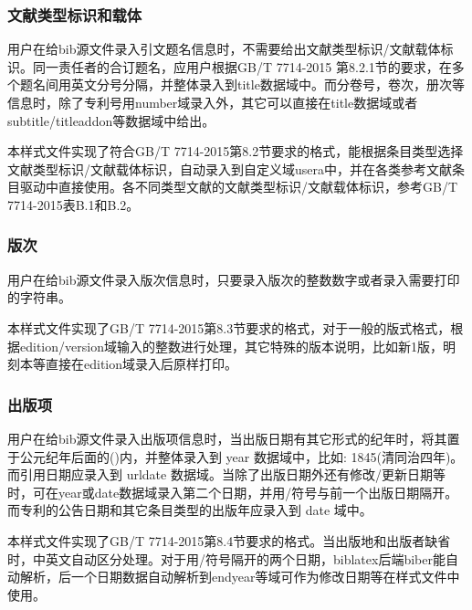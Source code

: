 \subsubsection{文献类型标识和载体}

\begin{property}{}{}
用户在给bib源文件录入引文题名信息时，不需要给出文献类型标识/文献载体标识。同一责任者的合订题名，应用户根据GB/T 7714-2015 第8.2.1节的要求，在多个题名间用英文分号分隔，并整体录入到title数据域中。而分卷号，卷次，册次等信息时，除了专利号用number域录入外，其它可以直接在title数据域或者subtitle/titleaddon等数据域中给出。

本样式文件实现了符合GB/T 7714-2015第8.2节要求的格式，能根据条目类型选择文献类型标识/文献载体标识，自动录入到自定义域usera中，并在各类参考文献条目驱动中直接使用。各不同类型文献的文献类型标识/文献载体标识，参考GB/T 7714-2015表B.1和B.2。
\end{property}

\subsubsection{版次}\label{sec:fmt:edition}

\begin{property}{}{}
用户在给bib源文件录入版次信息时，只要录入版次的整数数字或者录入需要打印的字符串。

本样式文件实现了GB/T 7714-2015第8.3节要求的格式，对于一般的版式格式，根据edition/version域输入的整数进行处理，其它特殊的版本说明，比如新1版，明刻本等直接在edition域录入后原样打印。
\end{property}

\subsubsection{出版项}\label{sec:fmt:pubitem}

\begin{property}{}{}
用户在给bib源文件录入出版项信息时，当出版日期有其它形式的纪年时，将其置于公元纪年后面的()内，并整体录入到 year 数据域中，比如: 1845(清同治四年)。而引用日期应录入到 urldate 数据域。当除了出版日期外还有修改/更新日期等时，可在year或date数据域录入第二个日期，并用/符号与前一个出版日期隔开。而专利的公告日期和其它条目类型的出版年应录入到 date 域中。

本样式文件实现了GB/T 7714-2015第8.4节要求的格式。当出版地和出版者缺省时，中英文自动区分处理。对于用/符号隔开的两个日期，biblatex后端biber能自动解析，后一个日期数据自动解析到endyear等域可作为修改日期等在样式文件中使用。
\end{property}

